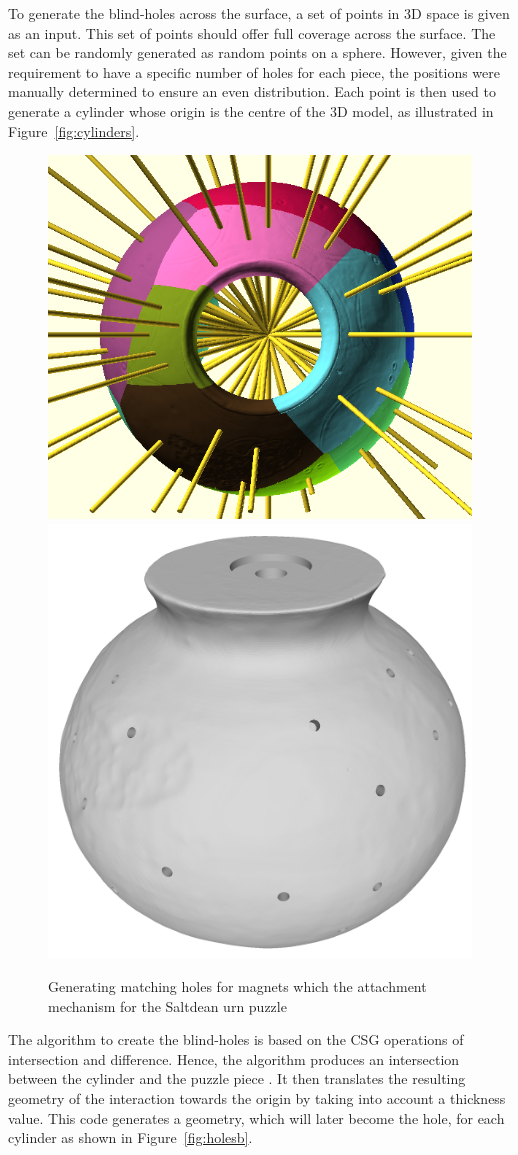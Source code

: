 \documentclass[acmlarge,screen,dvipsnames]{acmart}
\begin{document}
To generate the blind-holes across the surface, a set of points in 3D
space is given as an input. This set of points should offer full
coverage across the surface. The set can be randomly generated as
random points on a sphere. However, given the requirement to have a
specific number of holes for each piece, the positions were manually
determined to ensure an even distribution. Each point is then used to
generate a cylinder whose origin is the centre of the 3D model, as
illustrated in Figure~\ref{fig:cylinders}.
%
\begin{figure}[htb]
  \centering
  {\includegraphics[width=0.45\linewidth]{images/allcylinders.jpg}}
  {\includegraphics[width=0.45\linewidth]{images/coreholes}}
 \caption{Generating \MSedit[of]{} matching holes for  magnets which  the attachment mechanism for the Saltdean urn puzzle}
\end{figure}

The algorithm to create the blind-holes is based on the CSG operations of intersection
and difference. Hence, the algorithm produces an intersection between the cylinder and  the puzzle piece . It then
translates the resulting geometry of the interaction towards the
origin by taking into account a thickness value. This code generates a
geometry, which will later become the hole, for each cylinder as shown
in Figure~\ref{fig:holesb}.
\end{document}
